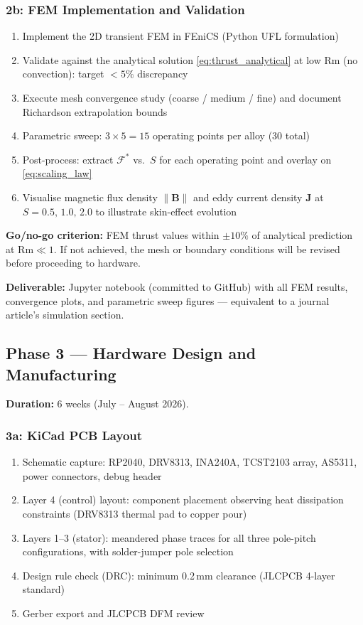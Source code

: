 \documentclass[12pt,letterpaper]{article}
\begin{document}
\subsubsection{2b: FEM Implementation and Validation}

\begin{enumerate}[noitemsep, label=\arabic*.]
  \item Implement the 2D transient FEM in FEniCS (Python UFL formulation)
  \item Validate against the analytical solution \cref{eq:thrust_analytical} at
    low Rm (no convection): target $< 5\%$ discrepancy
  \item Execute mesh convergence study (coarse / medium / fine) and document
    Richardson extrapolation bounds
  \item Parametric sweep: $3 \times 5 = 15$ operating points per alloy (30 total)
  \item Post-process: extract $\mathcal{F}^*$ vs.\ $S$ for each operating point and
    overlay on \cref{eq:scaling_law}
  \item Visualise magnetic flux density $\|\mathbf{B}\|$ and eddy current density
    $\mathbf{J}$ at $S = 0.5,\,1.0,\,2.0$ to illustrate skin-effect evolution
\end{enumerate}

\textbf{Go/no-go criterion:} FEM thrust values within $\pm 10\%$ of analytical
prediction at $\mathrm{Rm} \ll 1$. If not achieved, the mesh or boundary conditions
will be revised before proceeding to hardware.

\textbf{Deliverable:} Jupyter notebook (committed to GitHub) with all FEM results,
convergence plots, and parametric sweep figures — equivalent to a journal article's
simulation section.

\subsection{Phase 3 — Hardware Design and Manufacturing}

\textbf{Duration:} 6 weeks (July -- August 2026).

\subsubsection{3a: KiCad PCB Layout}

\begin{enumerate}[noitemsep, label=\arabic*.]
  \item Schematic capture: RP2040, DRV8313, INA240A, TCST2103 array, AS5311, power
    connectors, debug header
  \item Layer 4 (control) layout: component placement observing heat dissipation
    constraints (DRV8313 thermal pad to copper pour)
  \item Layers 1--3 (stator): meandered phase traces for all three pole-pitch
    configurations, with solder-jumper pole selection
  \item Design rule check (DRC): minimum 0.2\,mm clearance (JLCPCB 4-layer standard)
  \item Gerber export and JLCPCB DFM review
\end{enumerate}
\end{document}
